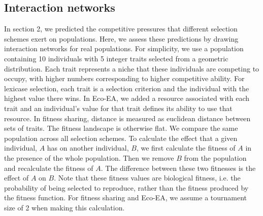 \subsection{Interaction networks}
In section 2, we predicted the competitive pressures that different selection schemes exert on populations. Here, we assess %
these predictions by drawing interaction networks for real populations. %
For simplicity, we use a population containing 10 individuals with 5 integer traits selected from a geometric distribution. Each trait represents a niche that these individuals are competing to occupy, with higher numbers corresponding to higher competitive ability. %
For lexicase selection, each trait %
is a selection criterion and the individual with the highest value there wins. In Eco-EA, we added a resource associated with each trait and an individual's value for that trait %
defines its ability to use that resource. In fitness sharing, distance is measured as euclidean distance between sets of traits. The fitness landscape is otherwise flat. We compare the same population across all selection schemes. To calculate the effect that a given individual, $A$ has on another individual, $B$, we first calculate the fitness of $A$ in the presence of the whole population. Then we remove $B$ from the population and recalculate the fitness of $A$. The difference between these two fitnesses is the effect of $A$ on $B$. Note that these fitness values are biological fitness, i.e. the probability of being selected to reproduce, rather than the fitness produced by the fitness function.  For fitness sharing and Eco-EA, we assume a tournament size of 2 when making this calculation.

